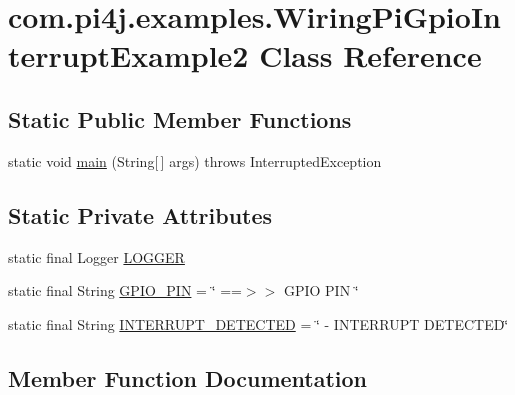 \hypertarget{classcom_1_1pi4j_1_1examples_1_1WiringPiGpioInterruptExample2}{}\section{com.\+pi4j.\+examples.\+Wiring\+Pi\+Gpio\+Interrupt\+Example2 Class Reference}
\label{classcom_1_1pi4j_1_1examples_1_1WiringPiGpioInterruptExample2}
\subsection*{Static Public Member Functions}
\begin{DoxyCompactItemize}
\item 
static void \hyperlink{classcom_1_1pi4j_1_1examples_1_1WiringPiGpioInterruptExample2_a52c618edef3f1a38c74e6720004c9d63}{main} (String\mbox{[}$\,$\mbox{]} args)  throws Interrupted\+Exception 
\end{DoxyCompactItemize}
\subsection*{Static Private Attributes}
\begin{DoxyCompactItemize}
\item 
static final Logger \hyperlink{classcom_1_1pi4j_1_1examples_1_1WiringPiGpioInterruptExample2_a758943cc0773bdc2ab72f5fb3a2a495b}{L\+O\+G\+G\+E\+R}
\item 
static final String \hyperlink{classcom_1_1pi4j_1_1examples_1_1WiringPiGpioInterruptExample2_a59971179eff4cd21e1faa52d6f37df88}{G\+P\+I\+O\+\_\+\+P\+I\+N} = \char`\"{} ==$>$$>$ G\+P\+I\+O P\+I\+N \char`\"{}
\item 
static final String \hyperlink{classcom_1_1pi4j_1_1examples_1_1WiringPiGpioInterruptExample2_a9b049c8a82cde617b6e7ad5a5f1ff724}{I\+N\+T\+E\+R\+R\+U\+P\+T\+\_\+\+D\+E\+T\+E\+C\+T\+E\+D} = \char`\"{} -\/ I\+N\+T\+E\+R\+R\+U\+P\+T D\+E\+T\+E\+C\+T\+E\+D\char`\"{}
\end{DoxyCompactItemize}


\subsection{Member Function Documentation}
\hypertarget{classcom_1_1pi4j_1_1examples_1_1WiringPiGpioInterruptExample2_a52c618edef3f1a38c74e6720004c9d63}{}

